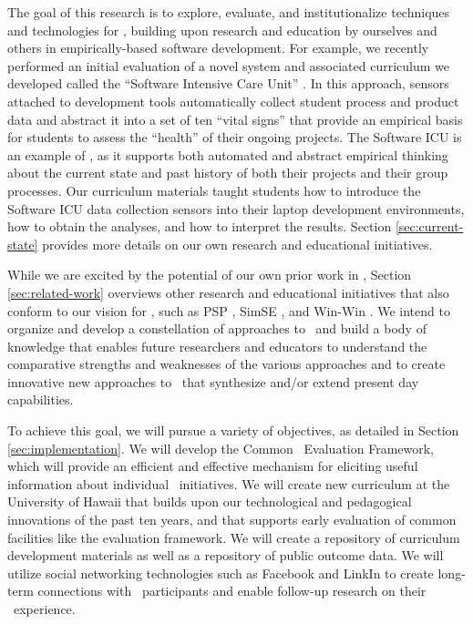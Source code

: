 The goal of this research is to explore, evaluate, and institutionalize
techniques and technologies for \eCT, building upon research and education
by ourselves and others in empirically-based software development.  For
example, we recently performed an initial evaluation of a novel system and
associated curriculum we developed called the ``Software Intensive Care
Unit'' \citep{csdl2-09-02}.  In this approach, sensors attached to
development tools automatically collect student process and product data
and abstract it into a set of ten ``vital signs'' that provide an empirical
basis for students to assess the ``health'' of their ongoing projects.  The
Software ICU is an example of \eCT, as it supports both automated and
abstract empirical thinking about the current state and past history of
both their projects and their group processes.  Our curriculum materials
taught students how to introduce the Software ICU data collection sensors
into their laptop development environments, how to obtain the analyses, and
how to interpret the results. Section \ref{sec:current-state} provides more
details on our own research and educational initiatives.

While we are excited by the potential of our own prior work in \eCT,
Section \ref{sec:related-work} overviews other research and educational
initiatives that also conform to our vision for \eCT, such as PSP
\citep{Humphrey95}, SimSE \citep{Navarro07}, and Win-Win \citep{Valerdi07}.
We intend to organize and develop a constellation of approaches to \eCT\
and build a body of knowledge that enables future researchers and educators
to understand the comparative strengths and weaknesses of the various
approaches and to create innovative new approaches to \eCT\ that synthesize
and/or extend present day capabilities.

To achieve this goal, we will pursue a variety of objectives, as detailed in 
Section \ref{sec:implementation}.  We will develop the Common \eCT\
Evaluation Framework, which will provide an efficient and effective mechanism
for eliciting useful information about individual \eCT\ initiatives.  
We will create new curriculum at the University of Hawaii that builds
upon our technological and pedagogical innovations of the past ten years, and that 
supports early evaluation of common facilities like the evaluation framework. 
We will create a repository of curriculum development materials as well as a repository
of public outcome data. We will utilize social networking technologies such as
Facebook and LinkIn to create long-term connections with \eCT\ participants 
and enable follow-up research on their \eCT\ experience. 

